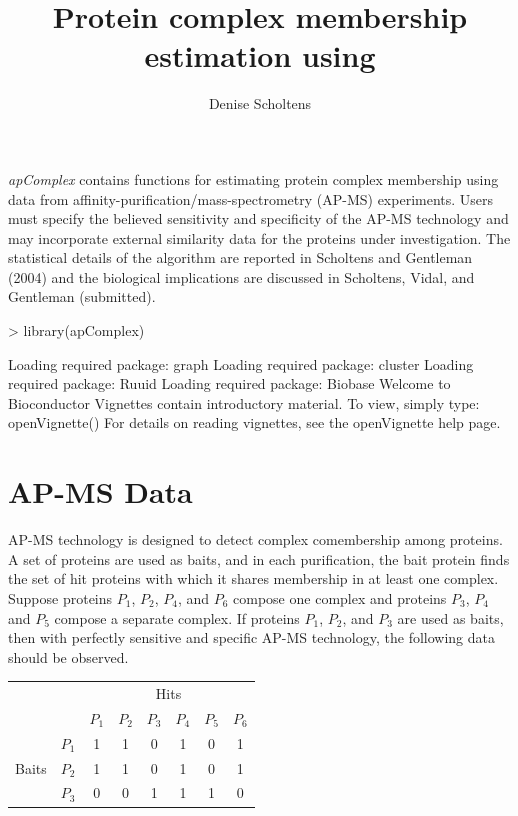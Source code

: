 \documentclass[11pt]{article}
\title{Protein complex membership estimation using \Rpackage{apComplex}}
\author{Denise Scholtens}
\date{}
\newcommand{\Rpackage}[1]{{\textit{#1}}}
\begin{document}
\maketitle
\Rpackage{apComplex} contains functions for estimating protein complex membership using data from
affinity-purification/mass-spectrometry (AP-MS) experiments.  Users must
specify the believed sensitivity and specificity of the AP-MS technology and
may incorporate external similarity data for the proteins under
investigation.  The statistical details of the algorithm are reported in
Scholtens and Gentleman (2004) and the biological implications are discussed
in Scholtens, Vidal, and Gentleman (submitted).  

\begin{Schunk}
\begin{Sinput}
> library(apComplex)
\end{Sinput}
\begin{Soutput}
Loading required package: graph
Loading required package: cluster
Loading required package: Ruuid
Loading required package: Biobase
Welcome to Bioconductor 
	 Vignettes contain introductory material.  To view, 
	 simply type: openVignette() 
	 For details on reading vignettes, see
	 the openVignette help page.
\end{Soutput}
\end{Schunk}

\section*{AP-MS Data}

AP-MS technology is designed to detect complex comembership among proteins.  A
set of proteins are used as baits, and in each purification, the bait protein finds the set of hit proteins with which it
shares membership in at least one complex.  Suppose proteins $P_{1}$, $P_{2}$, $P_{4}$,
and $P_{6}$ compose one complex and proteins $P_{3}$, $P_{4}$ and
$P_{5}$ compose a separate complex.  If proteins $P_{1}$, $P_{2}$, and $P_{3}$
are used as baits, then with perfectly sensitive and specific AP-MS
technology, the following data should be observed.

\vspace{.2in}

\begin{tabular}{cc|cccccc}
 & \multicolumn{1}{c}{} & \multicolumn{6}{c}{Hits} \\
 & \multicolumn{1}{c}{} & $P_{1}$ & $P_{2}$ & $P_{3}$ & $P_{4}$ & $P_{5}$ & $P_{6}$  \\
\cline{3-8}
 & $P_{1}$ & 1 & 1 & 0 & 1 & 0 & 1 \\
Baits & $P_{2}$ & 1 & 1 & 0 & 1 & 0 & 1 \\
 & $P_{3}$ & 0 & 0 & 1 & 1 & 1 & 0 \\
\end{tabular}
\end{document}
